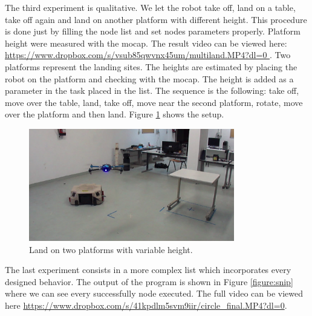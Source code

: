 The third experiment is qualitative. We let the robot take off, land on a table, take off again and land on another platform with different height. This procedure is done just by filling the node list and set nodes parameters properly. Platform height were measured with the mocap. The result video can be viewed here: \url{https://www.dropbox.com/s/vsub85qwvnx45um/multiland.MP4?dl=0 }. Two platforms represent the landing sites. The heights are estimated by placing the robot on the platform and checking with the mocap. The height is added as a parameter in the task placed in the list. The sequence is the following: take off, move over the table, land, take off, move near the second platform, rotate, move over the platform and then land. Figure \ref{figure:multiland} shows the setup.

\begin{figure}[h]
\centering
 \includegraphics[width=0.8\textwidth]{multiland.png}
 \caption{Land on two platforms with variable height.}
 \label{figure:multiland}
\end{figure}

The last experiment consists in a more complex list which incorporates every designed behavior. The output of the program is shown in Figure \ref{figure:snip} where we can see every successfully node executed. The full video can be viewed here \url{https://www.dropbox.com/s/41kpdlm5svm9iir/circle_final.MP4?dl=0}. 

